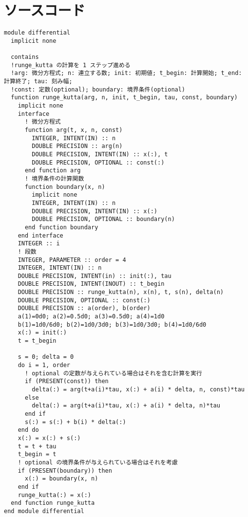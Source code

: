 \appendix
\def\thesection{補遺\Alph{section}}
\renewcommand*{\thelstlisting}{\Alph{section}.\arabic{lstlisting}}
\section{ソースコード}
\begin{lstlisting}[caption=Runge-Kutta関数のソースコード,label=srcRK4]
module differential
  implicit none
    
  contains
  !runge_kutta の計算を 1 ステップ進める
  !arg: 微分方程式; n: 連立する数; init: 初期値; t_begin: 計算開始; t_end: 計算終了; tau: 刻み幅;
  !const: 定数(optional); boundary: 境界条件(optional)
  function runge_kutta(arg, n, init, t_begin, tau, const, boundary)
    implicit none
    interface
      ! 微分方程式
      function arg(t, x, n, const)
        INTEGER, INTENT(IN) :: n
        DOUBLE PRECISION :: arg(n)
        DOUBLE PRECISION, INTENT(IN) :: x(:), t
        DOUBLE PRECISION, OPTIONAL :: const(:)
      end function arg
      ! 境界条件の計算関数
      function boundary(x, n)
        implicit none
        INTEGER, INTENT(IN) :: n
        DOUBLE PRECISION, INTENT(IN) :: x(:)
        DOUBLE PRECISION, OPTIONAL :: boundary(n)
      end function boundary
    end interface
    INTEGER :: i
    ! 段数
    INTEGER, PARAMETER :: order = 4
    INTEGER, INTENT(IN) :: n
    DOUBLE PRECISION, INTENT(in) :: init(:), tau
    DOUBLE PRECISION, INTENT(INOUT) :: t_begin
    DOUBLE PRECISION :: runge_kutta(n), x(n), t, s(n), delta(n)
    DOUBLE PRECISION, OPTIONAL :: const(:)
    DOUBLE PRECISION :: a(order), b(order)
    a(1)=0d0; a(2)=0.5d0; a(3)=0.5d0; a(4)=1d0
    b(1)=1d0/6d0; b(2)=1d0/3d0; b(3)=1d0/3d0; b(4)=1d0/6d0
    x(:) = init(:)
    t = t_begin

    s = 0; delta = 0
    do i = 1, order
      ! optional の定数が与えられている場合はそれを含む計算を実行
      if (PRESENT(const)) then 
        delta(:) = arg(t+a(i)*tau, x(:) + a(i) * delta, n, const)*tau
      else
        delta(:) = arg(t+a(i)*tau, x(:) + a(i) * delta, n)*tau
      end if
      s(:) = s(:) + b(i) * delta(:)
    end do
    x(:) = x(:) + s(:)
    t = t + tau
    t_begin = t
    ! optional の境界条件が与えられている場合はそれを考慮
    if (PRESENT(boundary)) then
      x(:) = boundary(x, n)
    end if
    runge_kutta(:) = x(:)
  end function runge_kutta
end module differential
\end{lstlisting}
\newpage
